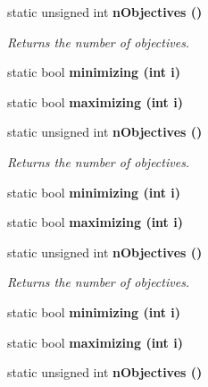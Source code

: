 \begin{CompactItemize}
\item 
static unsigned int \bf{n\-Objectives} ()\label{classObjectiveVectorTraits_8f8cb44cfe76117ab1c5624e4fced91f}

\begin{CompactList}\small\item\em Returns the number of objectives. \item\end{CompactList}\item 
static bool \bf{minimizing} (int i)\label{classObjectiveVectorTraits_52dc1c3dd95f37fe256708f40189a6fd}

\item 
static bool \bf{maximizing} (int i)\label{classObjectiveVectorTraits_69ddc04a4bf7b842f5457f7cff09c479}

\item 
static unsigned int \bf{n\-Objectives} ()\label{classObjectiveVectorTraits_8f8cb44cfe76117ab1c5624e4fced91f}

\begin{CompactList}\small\item\em Returns the number of objectives. \item\end{CompactList}\item 
static bool \bf{minimizing} (int i)\label{classObjectiveVectorTraits_52dc1c3dd95f37fe256708f40189a6fd}

\item 
static bool \bf{maximizing} (int i)\label{classObjectiveVectorTraits_69ddc04a4bf7b842f5457f7cff09c479}

\item 
static unsigned int \bf{n\-Objectives} ()\label{classObjectiveVectorTraits_8f8cb44cfe76117ab1c5624e4fced91f}

\begin{CompactList}\small\item\em Returns the number of objectives. \item\end{CompactList}\item 
static bool \bf{minimizing} (int i)\label{classObjectiveVectorTraits_52dc1c3dd95f37fe256708f40189a6fd}

\item 
static bool \bf{maximizing} (int i)\label{classObjectiveVectorTraits_69ddc04a4bf7b842f5457f7cff09c479}

\item 
static unsigned int \bf{n\-Objectives} ()\label{classObjectiveVectorTraits_8f8cb44cfe76117ab1c5624e4fced91f}


\end{CompactItemize}
